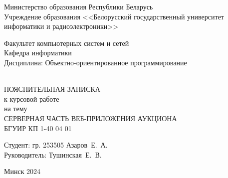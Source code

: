 \begin{titlepage}
  \begin{center}
    Министерство образования Республики Беларусь\\[0.4em]
    Учреждение образования <<Белорусский государственный университет информатики и радиоэлектроники>>\\[3.5em]

    \begin{minipage}{\textwidth}
      \begin{flushleft}
          Факультет компьютерных систем и сетей\\[1em]

          Кафедра информатики\\[1em]

          Дисциплина: Объектно-ориентированное программирование
      \end{flushleft}
    \end{minipage}\\[3em]

    {ПОЯСНИТЕЛЬНАЯ ЗАПИСКА}\\
    {к курсовой работе}\\
    {на тему}\\[1em]
    \MakeTextUppercase{Серверная часть веб-приложения аукциона}\\[1em]


    {БГУИР КП 1-40 04 01}

    \vspace{8em}

    \begin{flushright}
        \begin{minipage}{9.3cm}
            Студент:  гр. 253505 Азаров~Е.~А.\\[1.4em]

            Руководитель: \mbox{Тушинская~Е.~В.}
        \end{minipage}
    \end{flushright}

    \vfill
    {\normalsize Минск 2024}
  \end{center}
\end{titlepage}
